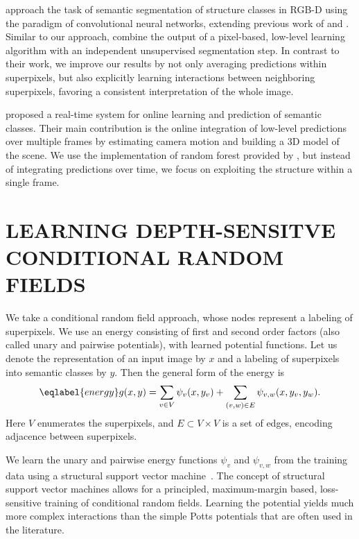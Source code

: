 \documentclass[a4paper, 10pt, conference]{ieeeconf}      %
\begin{document}
\citet{couprie-iclr-13} approach the task of semantic segmentation of structure classes
in RGB-D using the paradigm of convolutional neural networks, extending
previous work of \citet{farabet-pami-13} and \citet{schulz2012learning}.
Similar to our approach, \citet{couprie-iclr-13} combine the output of a
pixel-based, low-level learning algorithm with an independent unsupervised
segmentation step. In contrast to their work, we improve our results by not
only averaging predictions within superpixels, but also explicitly learning
interactions between neighboring superpixels, favoring a consistent
interpretation of the whole image.

\citet{stueckler2013} proposed a real-time system for online learning and prediction of semantic classes.
Their main contribution is the online integration of low-level predictions over multiple frames
by estimating camera motion and building a 3D model of the scene.
We use the implementation of random forest provided by \citet{stueckler2013}, but instead of
integrating predictions over time, we focus on exploiting the structure within a single frame.

\section{LEARNING DEPTH-SENSITVE CONDITIONAL RANDOM FIELDS}
We take a conditional random field approach, whose nodes represent a labeling of
superpixels.  We use an energy consisting of first and second order factors
(also called unary and pairwise potentials), with learned potential functions.
Let us denote the representation of an input image by $x$ and a labeling of
superpixels into semantic classes by $y$.  Then the general form of the energy is
\begin{equation}\eqlabel{energy}
    g(x, y) = \sum_{v \in V} \psi_v(x, y_v) + \sum_{(v, w) \in E} \psi_{v,w}(x, y_{v}, y_{w}).
\end{equation}
Here $V$ enumerates the superpixels, and $E\subset V \times V$ is a set of
edges, encoding adjacence between superpixels.

We learn the unary and pairwise energy functions $\psi_v$ and $\psi_{v, w}$ from the training data
using a structural support vector machine~\citep{joachims2009cutting}. 
The concept of structural support vector machines allows for a principled,
maximum-margin based, loss-sensitive training of conditional random fields. Learning the potential yields much
more complex interactions than the simple Potts potentials that are often used in the literature.
\end{document}
